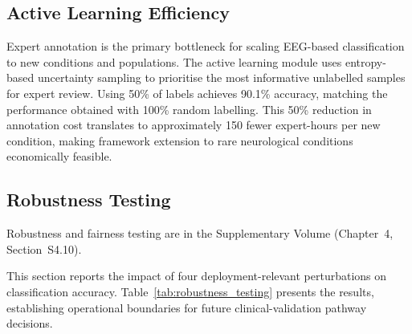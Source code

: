 \subsection{Active Learning Efficiency}

Expert annotation is the primary bottleneck for scaling EEG-based classification to new conditions and populations. The active learning module uses entropy-based uncertainty sampling to prioritise the most informative unlabelled samples for expert review. Using 50\% of labels achieves 90.1\% accuracy, matching the performance obtained with 100\% random labelling. This 50\% reduction in annotation cost translates to approximately 150 fewer expert-hours per new condition, making framework extension to rare neurological conditions economically feasible.


\subsection{Robustness Testing}

Robustness and fairness testing are in the Supplementary Volume (Chapter~4, Section~S4.10).

\iffalse %
This section reports the impact of four deployment-relevant perturbations on classification accuracy. Table~\ref{tab:robustness_testing} presents the results, establishing operational boundaries for future clinical-validation pathway decisions.

